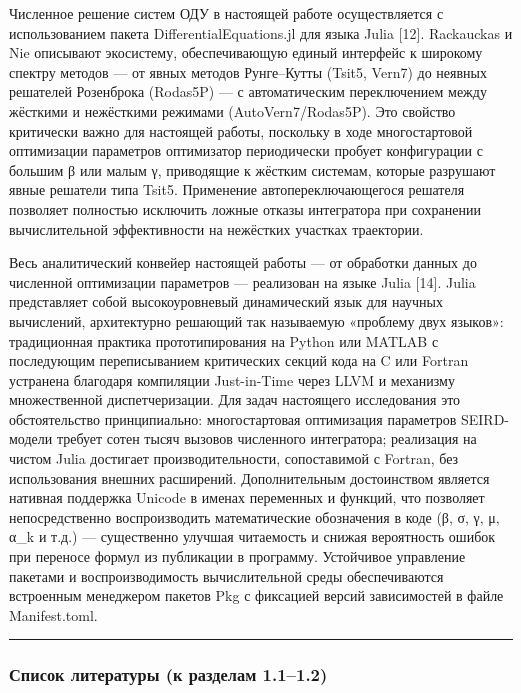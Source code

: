 \documentclass[12pt]{article}
\begin{document}
Численное решение систем ОДУ в настоящей работе осуществляется с
использованием пакета DifferentialEquations.jl для языка Julia {[}12{]}.
Rackauckas и Nie описывают экосистему, обеспечивающую единый интерфейс к
широкому спектру методов --- от явных методов Рунге--Кутты (Tsit5,
Vern7) до неявных решателей Розенброка (Rodas5P) --- с автоматическим
переключением между жёсткими и нежёсткими режимами (AutoVern7/Rodas5P).
Это свойство критически важно для настоящей работы, поскольку в ходе
многостартовой оптимизации параметров оптимизатор периодически пробует
конфигурации с большим β или малым γ, приводящие к жёстким системам,
которые разрушают явные решатели типа Tsit5. Применение
автопереключающегося решателя позволяет полностью исключить ложные
отказы интегратора при сохранении вычислительной эффективности на
нежёстких участках траектории.

Весь аналитический конвейер настоящей работы --- от обработки данных до
численной оптимизации параметров --- реализован на языке Julia {[}14{]}.
Julia представляет собой высокоуровневый динамический язык для научных
вычислений, архитектурно решающий так называемую «проблему двух языков»:
традиционная практика прототипирования на Python или MATLAB с
последующим переписыванием критических секций кода на C или Fortran
устранена благодаря компиляции Just-in-Time через LLVM и механизму
множественной диспетчеризации. Для задач настоящего исследования это
обстоятельство принципиально: многостартовая оптимизация параметров
SEIRD-модели требует сотен тысяч вызовов численного интегратора;
реализация на чистом Julia достигает производительности, сопоставимой с
Fortran, без использования внешних расширений. Дополнительным
достоинством является нативная поддержка Unicode в именах переменных и
функций, что позволяет непосредственно воспроизводить математические
обозначения в коде (β, σ, γ, μ, α\_k и т.д.) --- существенно улучшая
читаемость и снижая вероятность ошибок при переносе формул из публикации
в программу. Устойчивое управление пакетами и воспроизводимость
вычислительной среды обеспечиваются встроенным менеджером пакетов Pkg с
фиксацией версий зависимостей в файле Manifest.toml.

\begin{center}\rule{0.5\linewidth}{0.5pt}\end{center}

\subsubsection{Список литературы (к разделам
1.1--1.2)}\label{ux441ux43fux438ux441ux43eux43a-ux43bux438ux442ux435ux440ux430ux442ux443ux440ux44b-ux43a-ux440ux430ux437ux434ux435ux43bux430ux43c-1.11.2}
\end{document}

